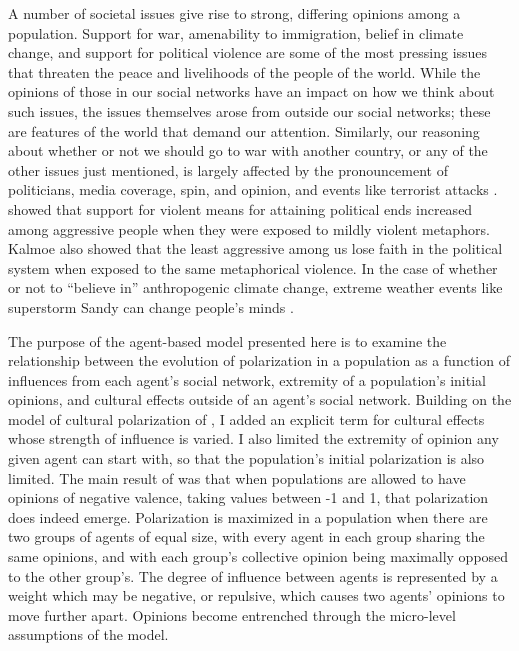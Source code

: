 \documentclass[11pt,letterpaper]{article}
\begin{document}
A number of societal issues give rise to strong, differing opinions among a
population. Support for war, amenability to immigration, belief in climate change,
and support for political violence are some of the most pressing issues that 
threaten the peace and livelihoods of the people of the world. While the opinions
of those in our social networks have an impact on how we think about such issues,
the issues themselves arose from outside our social networks; these are features
of the world that demand our attention. Similarly, our reasoning about whether
or not we should go to war with another country, or any of the other issues
just mentioned, is largely affected by the pronouncement of politicians, 
media coverage, spin, and opinion, and events like terrorist attacks \cite{Martin2016}. 
 showed that support for violent means for attaining political
ends increased among aggressive people when they were exposed to mildly violent
metaphors. Kalmoe also showed that the least aggressive among us lose faith in
the political system when exposed to the same metaphorical violence.
In the case of whether or not to ``believe in'' anthropogenic climate change, 
extreme weather events like superstorm Sandy can change people's minds \cite{Rudman2013}.

The purpose of the agent-based model presented here is to examine the relationship
between the evolution of polarization in a population as a function of 
influences from each agent's social network,
extremity of a population's initial opinions, and cultural effects outside of 
an agent's social network. Building on the model of cultural polarization of
, I added an explicit term for cultural effects whose strength
of influence is varied. I also limited the extremity of opinion any given agent
can start with, so that the population's initial polarization is also limited.
The main result of  was that when populations are allowed to
have opinions of negative valence, taking values between -1 and 1, that polarization 
does indeed emerge. Polarization is maximized in a population when there are two
groups of agents of equal size, with every agent in each group sharing the
same opinions, and with each group's collective opinion being maximally opposed to 
the other group's. The degree of influence between agents is represented by a
weight which may be negative, or repulsive, 
which causes two agents' opinions to move further apart. Opinions become 
entrenched through the micro-level assumptions of the model.
\end{document}

